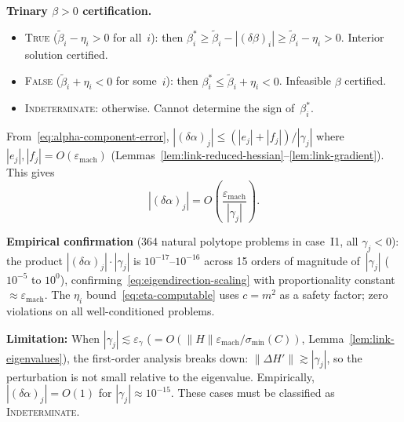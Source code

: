 \begin{lemma}
\medskip\noindent
\textbf{Trinary $\beta > 0$ certification.}
\begin{itemize}
  \item \textsc{True}
    ($\tilde\beta_i - \eta_i > 0$ for all~$i$):
    then $\beta^*_i \geq \tilde\beta_i - |(\delta\beta)_i|
    \geq \tilde\beta_i - \eta_i > 0$.
    Interior solution certified.
  \item \textsc{False}
    ($\tilde\beta_i + \eta_i < 0$ for some~$i$):
    then $\beta^*_i \leq \tilde\beta_i + \eta_i < 0$.
    Infeasible $\beta$ certified.
  \item \textsc{Indeterminate}: otherwise.
    Cannot determine the sign of~$\beta^*_i$.
\end{itemize}

\end{lemma}


\begin{remark}%
\label{rem:eigendirection-error}
From~\eqref{eq:alpha-component-error},
$|(\delta\alpha)_j| \leq (|e_j| + |f_j|) / |\gamma_j|$
where $|e_j|, |f_j| = O(\varepsilon_{\mathrm{mach}})$
(Lemmas~\ref{lem:link-reduced-hessian}--\ref{lem:link-gradient}).
This gives
\begin{equation}\label{eq:eigendirection-scaling}
  |(\delta\alpha)_j|
  = O\!\left(\frac{\varepsilon_{\mathrm{mach}}}{|\gamma_j|}\right).
\end{equation}

\textbf{Empirical confirmation}
(364 natural polytope problems in case~I1, all $\gamma_j < 0$):
the product $|(\delta\alpha)_j| \cdot |\gamma_j|$ is
$10^{-17}$--$10^{-16}$ across 15 orders of magnitude of~$|\gamma_j|$
($10^{-5}$ to $10^0$), confirming~\eqref{eq:eigendirection-scaling}
with proportionality constant $\approx \varepsilon_{\mathrm{mach}}$.
The $\eta_i$ bound~\eqref{eq:eta-computable} uses $c = m^2$
as a safety factor; zero violations on all well-conditioned problems.

\textbf{Limitation:}
When $|\gamma_j| \lesssim \varepsilon_\gamma$
($= O(\|H\| \varepsilon_{\mathrm{mach}} / \sigma_{\min}(C))$,
Lemma~\ref{lem:link-eigenvalues}),
the first-order analysis breaks down:
$\|\Delta H'\| \gtrsim |\gamma_j|$, so the perturbation
is not small relative to the eigenvalue.
Empirically, $|(\delta\alpha)_j| = O(1)$ for $|\gamma_j| \approx 10^{-15}$.
These cases must be classified as \textsc{Indeterminate}.

\end{remark}


